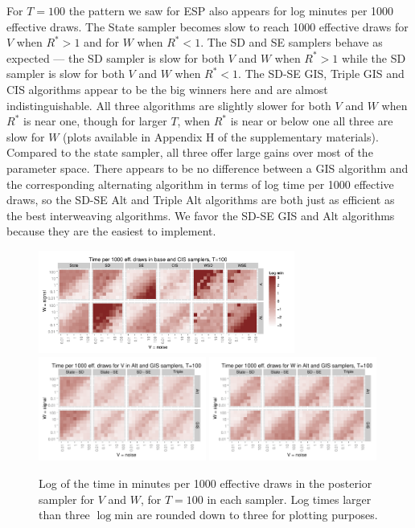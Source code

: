\documentclass[12pt]{article}
\begin{document}
For $T=100$ the pattern we saw for ESP also appears for log minutes per 1000 effective draws. The State sampler becomes slow to reach 1000 effective draws for $V$ when $R^*>1$ and for $W$ when $R^*<1$. The SD and SE samplers behave as expected --- the SD sampler is slow for both $V$ and $W$ when $R^*>1$ while the SD sampler is slow for both $V$ and $W$ when $R^*<1$. The SD-SE GIS, Triple GIS and CIS algorithms appear to be the big winners here and are almost indistinguishable. All three algorithms are slightly slower for both $V$ and $W$ when $R^*$ is near one, though for larger $T$,  when $R^*$ is near or below one all three are slow for $W$ (plots available in Appendix H of the supplementary materials). Compared to the state sampler, all three offer large gains over most of the parameter space. There appears to be no difference between a GIS algorithm and the corresponding alternating algorithm in terms of log time per 1000 effective draws, so the SD-SE Alt and Triple Alt algorithms are both just as efficient as the best interweaving algorithms. We favor the SD-SE GIS and Alt algorithms because they are the easiest to implement.

\begin{figure}[!h]
\centering
\includegraphics[width=0.75\textwidth]{basecistimeplot100}
\includegraphics[width=0.49\textwidth]{altgisVtimeplot100}
\includegraphics[width=0.49\textwidth]{altgisWtimeplot100}
\caption{Log of the time in minutes per 1000 effective draws in the posterior sampler for $V$ and $W$, for $T=100$ in each sampler. Log times larger than three $\log \mathrm{min}$ are rounded down to three for plotting purposes.}
\label{baseinttimeplot}
\end{figure}
\end{document}
